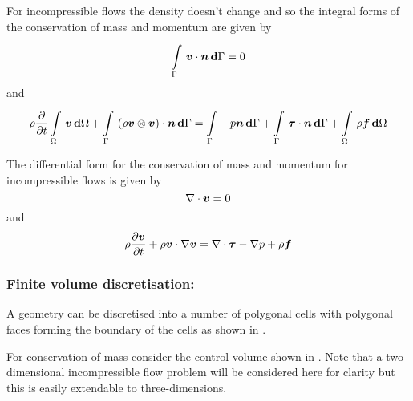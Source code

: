 For incompressible flows the density doesn't change and so the
integral forms of the conservation of mass and momentum are given by
\begin{equation}
    \displaystyle\int\limits_{\Gamma}^{} \,\boldsymbol{v}\cdot\boldsymbol{n}\, \boldsymbol{\mathrm{d}} \Gamma =0
\end{equation}
and
\begin{equation}
  \rho \dfrac{\partial }{\partial t}   \displaystyle\int\limits_{\Omega}^{} \,\boldsymbol{v}\, \boldsymbol{\mathrm{d}} \Omega +  \displaystyle\int\limits_{\Gamma}^{} \,\left(  \rho\boldsymbol{v} \otimes \boldsymbol{v}  \right)\cdot\boldsymbol{n}\, \boldsymbol{\mathrm{d}} \Gamma 
  =  \displaystyle\int\limits_{\Gamma}^{} \,-p\boldsymbol{n}\, \boldsymbol{\mathrm{d}} \Gamma +  \displaystyle\int\limits_{\Gamma}^{} \,\boldsymbol{\mathit{\tau}}\cdot\boldsymbol{n}\, \boldsymbol{\mathrm{d}} \Gamma 
  +  \displaystyle\int\limits_{\Omega}^{} \,\rho\boldsymbol{f}\, \boldsymbol{\mathrm{d}} \Omega 
\end{equation}

The differential form for the conservation of mass and momentum for
incompressible flows is given by
\begin{equation}
  \divergence{}{\vectr{v}}=0
\end{equation}
and
\begin{equation}
  \rho\delby{\vectr{v}}{t}+\dotprod{\rho\vectr{v}}{\gradient{}{\vectr{v}}}=\divergence{}{\tensor{\tau}}-\gradient{}{p}+\rho\vectr{f}
\end{equation}

\subsubsection{Finite volume discretisation:}

A geometry can be discretised into a number of polygonal cells with polygonal
faces forming the boundary of the cells as shown in .


For conservation of mass consider the control volume shown in
. Note that a two-dimensional incompressible flow problem will be
considered here for clarity but this is easily extendable to three-dimensions.


